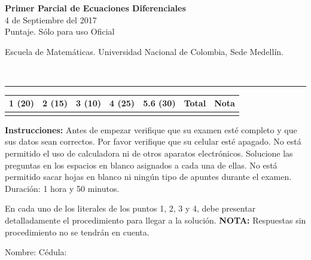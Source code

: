 \documentclass[11pt]{article}
\begin{document}
\noindent
\begin{minipage}[t]{0.62\linewidth}
  {\bfseries\large Primer Parcial de Ecuaciones Diferenciales}\\[2pt]
  {\small 4 de Septiembre del 2017}\\
  {\small Puntaje. Sólo para uso Oficial}
\end{minipage}%
\hfill
\begin{minipage}[t]{0.35\linewidth}
  \raggedleft\small Escuela de Matemáticas. Universidad Nacional de Colombia, Sede Medellín.
\end{minipage}\\[4pt]
\rule{\linewidth}{0.6pt}

\vspace{4pt}
\noindent
\begin{tabular}{|c|c|c|c|c|c|c|}
\hline
1 (20) & 2 (15) & 3 (10) & 4 (25) & 5.6 (30) & Total & Nota \\
\hline
 & & & & & & \\
\hline
\end{tabular}

\vspace{6pt}
\noindent\textbf{Instrucciones:} Antes de empezar verifique que su examen esté completo y que sus datos sean correctos. Por favor verifique que su celular esté apagado. No está permitido el uso de calculadora ni de otros aparatos electrónicos. Solucione las preguntas en los espacios en blanco asignados a cada una de ellas. No está permitido sacar hojas en blanco ni ningún tipo de apuntes durante el examen. Duración: 1 hora y 50 minutos.

\vspace{4pt}
\noindent En cada uno de los literales de los puntos 1, 2, 3 y 4, debe presentar detalladamente el procedimiento para llegar a la solución. \textbf{NOTA:} Respuestas sin procedimiento no se tendrán en cuenta.

\vspace{8pt}
\noindent Nombre: \makebox[0.45\linewidth]{\hrulefill} \hfill Cédula: \makebox[0.3\linewidth]{\hrulefill}
\end{document}
